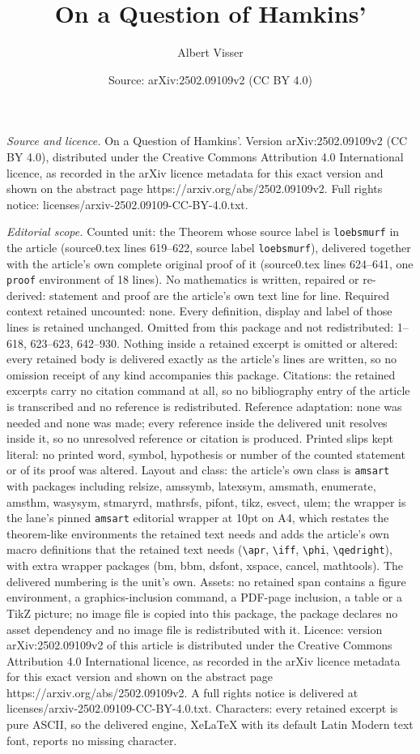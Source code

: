 \documentclass[10pt,a4paper]{amsart}
\title[On a Question of Hamkins']{On a Question of Hamkins'}
\author{Albert Visser}
\date{Source: arXiv:2502.09109v2 (CC BY 4.0)}
\begin{document}
\maketitle

\noindent\emph{Source and licence.} On a Question of Hamkins'. Version arXiv:2502.09109v2 (CC BY 4.0), distributed under the Creative Commons Attribution 4.0 International licence, as recorded in the arXiv licence metadata for this exact version and shown on the abstract page https://arxiv.org/abs/2502.09109v2. Full rights notice: licenses/arxiv-2502.09109-CC-BY-4.0.txt.\par\smallskip

\noindent\textit{Editorial scope.} Counted unit: the Theorem whose source label is \texttt{loebsmurf} in the article (source0.tex lines 619--622, source label \texttt{loebsmurf}), delivered together with the article's own complete original proof of it (source0.tex lines 624--641, one \texttt{proof} environment of 18 lines). No mathematics is written, repaired or re-derived: statement and proof are the article's own text line for line. Required context retained uncounted: none. Every definition, display and label of those lines is retained unchanged. Omitted from this package and not redistributed: 1--618, 623--623, 642--930. Nothing inside a retained excerpt is omitted or altered: every retained body is delivered exactly as the article's lines are written, so no omission receipt of any kind accompanies this package. Citations: the retained excerpts carry no citation command at all, so no bibliography entry of the article is transcribed and no reference is redistributed. Reference adaptation: none was needed and none was made; every reference inside the delivered unit resolves inside it, so no unresolved reference or citation is produced. Printed slips kept literal: no printed word, symbol, hypothesis or number of the counted statement or of its proof was altered. Layout and class: the article's own class is \texttt{amsart} with packages including relsize, amssymb, latexsym, amsmath, enumerate, amsthm, wasysym, stmaryrd, mathrsfs, pifont, tikz, esvect, ulem; the wrapper is the lane's pinned \texttt{amsart} editorial wrapper at 10pt on A4, which restates the theorem-like environments the retained text needs and adds the article's own macro definitions that the retained text needs (\texttt{\textbackslash apr}, \texttt{\textbackslash iff}, \texttt{\textbackslash phi}, \texttt{\textbackslash qedright}), with extra wrapper packages (bm, bbm, dsfont, xspace, cancel, mathtools). The delivered numbering is the unit's own. Assets: no retained span contains a figure environment, a graphics-inclusion command, a PDF-page inclusion, a table or a TikZ picture; no image file is copied into this package, the package declares no asset dependency and no image file is redistributed with it. Licence: version arXiv:2502.09109v2 of this article is distributed under the Creative Commons Attribution 4.0 International licence, as recorded in the arXiv licence metadata for this exact version and shown on the abstract page https://arxiv.org/abs/2502.09109v2. A full rights notice is delivered at licenses/arxiv-2502.09109-CC-BY-4.0.txt. Characters: every retained excerpt is pure ASCII, so the delivered engine, XeLaTeX with its default Latin Modern text font, reports no missing character.
\end{document}

